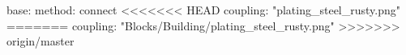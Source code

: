 base:
  method: connect
<<<<<<< HEAD
  coupling: "plating_steel_rusty.png"
=======
  coupling: "Blocks/Building/plating_steel_rusty.png"
>>>>>>> origin/master
